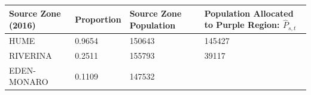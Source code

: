 \documentclass[11pt,a4paper,]{article}
\begin{document}
\begin{longtable}[]{@{}llll@{}}
\toprule
\begin{minipage}[b]{0.21\columnwidth}\raggedright
Source Zone (2016)\strut
\end{minipage} & \begin{minipage}[b]{0.10\columnwidth}\raggedright
Proportion\strut
\end{minipage} & \begin{minipage}[b]{0.11\columnwidth}\raggedright
Source Zone Population\strut
\end{minipage} & \begin{minipage}[b]{0.46\columnwidth}\raggedright
Population Allocated to Purple Region: \(\hat{P}_{s,t}\)\strut
\end{minipage}\tabularnewline
\midrule
\endhead
\begin{minipage}[t]{0.21\columnwidth}\raggedright
HUME\strut
\end{minipage} & \begin{minipage}[t]{0.10\columnwidth}\raggedright
0.9654\strut
\end{minipage} & \begin{minipage}[t]{0.11\columnwidth}\raggedright
150643\strut
\end{minipage} & \begin{minipage}[t]{0.46\columnwidth}\raggedright
145427\strut
\end{minipage}\tabularnewline
\begin{minipage}[t]{0.21\columnwidth}\raggedright
RIVERINA\strut
\end{minipage} & \begin{minipage}[t]{0.10\columnwidth}\raggedright
0.2511\strut
\end{minipage} & \begin{minipage}[t]{0.11\columnwidth}\raggedright
155793\strut
\end{minipage} & \begin{minipage}[t]{0.46\columnwidth}\raggedright
39117\strut
\end{minipage}\tabularnewline
\begin{minipage}[t]{0.21\columnwidth}\raggedright
EDEN-MONARO\strut
\end{minipage} & \begin{minipage}[t]{0.10\columnwidth}\raggedright
0.1109\strut
\end{minipage} & \begin{minipage}[t]{0.11\columnwidth}\raggedright
147532\strut
\end{minipage} & \begin{minipage}[t]{0.46\columnwidth}\raggedright

\end{minipage}
\end{longtable}
\end{document}
